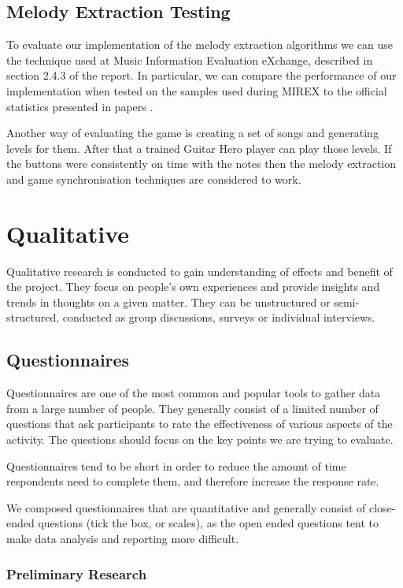 \subsection{Melody Extraction Testing}
To evaluate our implementation of the melody extraction algorithms we can use the technique used at Music Information Evaluation eXchange, described in section 2.4.3 of the report. In particular, we can compare the performance of our implementation when tested on the samples used during MIREX to the official statistics presented in papers \cite{salamon, comparison}.

Another way of evaluating the game is creating a set of songs and generating levels for them. After that a trained Guitar Hero player can play those levels. If the buttons were consistently on time with the notes then the melody extraction and game synchronisation techniques are considered to work.

\section{Qualitative}
Qualitative research is conducted to gain understanding of effects and benefit of the project. They focus on people's own experiences and provide insights and trends in thoughts on a given matter. They can be unstructured or semi-structured, conducted as group discussions, surveys or individual interviews.



\subsection{Questionnaires}
Questionnaires are one of the most common and popular tools to gather data from a large number of people. They generally consist of a limited number of questions that ask participants to rate the effectiveness of various aspects of the activity. The questions should focus on the key points we are trying to evaluate. 

Questionnaires tend to be short in order to reduce the amount of time respondents need to complete them, and therefore increase the response rate. 

We composed questionnaires that are quantitative and generally consist of close-ended questions (tick the box, or scales), as the open ended questions tent to make data analysis and reporting more difficult.

\subsubsection*{Preliminary Research}

